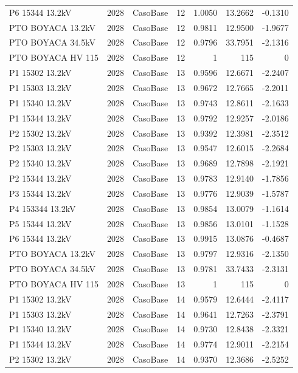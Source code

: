\documentclass[11pt,a4paper]{article}
\begin{document}
\begin{longtable}{llllrrr}
P6 15344 13.2kV & 2028 & CasoBase & 12 & 1.0050 & 13.2662 & -0.1310 \\
PTO BOYACA 13.2kV & 2028 & CasoBase & 12 & 0.9811 & 12.9500 & -1.9677 \\
PTO BOYACA 34.5kV & 2028 & CasoBase & 12 & 0.9796 & 33.7951 & -2.1316 \\
PTO BOYACA HV 115 & 2028 & CasoBase & 12 & 1 & 115 & 0 \\
P1 15302 13.2kV & 2028 & CasoBase & 13 & 0.9596 & 12.6671 & -2.2407 \\
P1 15303 13.2kV & 2028 & CasoBase & 13 & 0.9672 & 12.7665 & -2.2011 \\
P1 15340 13.2kV & 2028 & CasoBase & 13 & 0.9743 & 12.8611 & -2.1633 \\
P1 15344 13.2kV & 2028 & CasoBase & 13 & 0.9792 & 12.9257 & -2.0186 \\
P2 15302 13.2kV & 2028 & CasoBase & 13 & 0.9392 & 12.3981 & -2.3512 \\
P2 15303 13.2kV & 2028 & CasoBase & 13 & 0.9547 & 12.6015 & -2.2684 \\
P2 15340 13.2kV & 2028 & CasoBase & 13 & 0.9689 & 12.7898 & -2.1921 \\
P2 15344 13.2kV & 2028 & CasoBase & 13 & 0.9783 & 12.9140 & -1.7856 \\
P3 15344 13.2kV & 2028 & CasoBase & 13 & 0.9776 & 12.9039 & -1.5787 \\
P4 153344 13.2kV & 2028 & CasoBase & 13 & 0.9854 & 13.0079 & -1.1614 \\
P5 15344 13.2kV & 2028 & CasoBase & 13 & 0.9856 & 13.0101 & -1.1528 \\
P6 15344 13.2kV & 2028 & CasoBase & 13 & 0.9915 & 13.0876 & -0.4687 \\
PTO BOYACA 13.2kV & 2028 & CasoBase & 13 & 0.9797 & 12.9316 & -2.1350 \\
PTO BOYACA 34.5kV & 2028 & CasoBase & 13 & 0.9781 & 33.7433 & -2.3131 \\
PTO BOYACA HV 115 & 2028 & CasoBase & 13 & 1 & 115 & 0 \\
P1 15302 13.2kV & 2028 & CasoBase & 14 & 0.9579 & 12.6444 & -2.4117 \\
P1 15303 13.2kV & 2028 & CasoBase & 14 & 0.9641 & 12.7263 & -2.3791 \\
P1 15340 13.2kV & 2028 & CasoBase & 14 & 0.9730 & 12.8438 & -2.3321 \\
P1 15344 13.2kV & 2028 & CasoBase & 14 & 0.9774 & 12.9011 & -2.2154 \\
P2 15302 13.2kV & 2028 & CasoBase & 14 & 0.9370 & 12.3686 & -2.5252 \\

\end{longtable}
\end{document}
